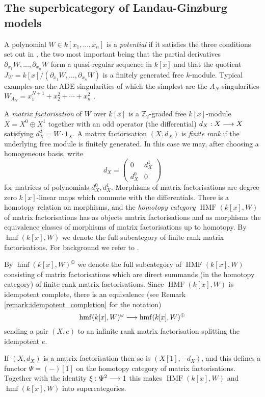 \documentclass[english,letter paper,12pt,leqno]{article}
\theoremstyle{example}
\numberwithin{equation}{section}
\DeclareMathOperator{\hmf}{hmf}
\DeclareMathOperator{\HMF}{HMF}
\begin{document}
\subsection{The superbicategory of Landau-Ginzburg models}\label{section:superbicatLG}

A polynomial $W \in k[x_1,\ldots,x_n]$ is a \emph{potential} if it satisfies the three conditions set out in \cite[Section 2.2]{lgdual}, the two most important being that the partial derivatives $\partial_{x_1} W, \ldots, \partial_{x_n} W$ form a quasi-regular sequence in $k[x]$ and that the quotient $J_W = k[x]/(\partial_{x_1} W, \ldots, \partial_{x_n} W)$ is a finitely generated free $k$-module. Typical examples are the ADE singularities \cite[I \S 2.4]{greuel} of which the simplest are the $A_N$-singularities $W_{A_N} = x_1^{N+1} + x_2^2 + \cdots + x_n^2$ .

A \emph{matrix factorisation} of $W$ over $k[x]$ is a $\mathbb{Z}_2$-graded free $k[x]$-module $X = X^0 \oplus X^1$ together with an odd operator (the differential) $d_X: X \longrightarrow X$ satisfying $d_X^2 = W \cdot 1_X$. A matrix factorisation $(X,d_X)$ is \emph{finite rank} if the underlying free module is finitely generated. In this case we may, after choosing a homogeneous basis, write
\[
d_X = \begin{pmatrix} 0 & d_X^1 \\ d_X^0 & 0 \end{pmatrix}
\]
for matrices of polynomials $d_X^0, d_X^1$. Morphisms of matrix factorisations are degree zero $k[x]$-linear maps which commute with the differentials. There is a homotopy relation on morphisms, and the \emph{homotopy category} $\HMF(k[x],W)$ of matrix factorisations has as objects matrix factorisations and as morphisms the equivalence classes of morphisms of matrix factorisations up to homotopy. By $\hmf(k[x],W)$ we denote the full subcategory of finite rank matrix factorisations. For background we refer to \cite{yoshino98}.

By $\hmf(k[x],W)^{\oplus}$ we denote the full subcategory of $\HMF(k[x],W)$ consisting of matrix factorisations which are direct summands (in the homotopy category) of finite rank matrix factorisations. Since $\HMF(k[x],W)$ is idempotent complete, there is an equivalence (see Remark \ref{remark:idempotent_completion} for the notation)
\[
\hmf(k[x],W)^\omega \lto \hmf(k[x],W)^{\oplus}
\]
sending a pair $(X,e)$ to an infinite rank matrix factorisation splitting the idempotent $e$.

If $(X,d_X)$ is a matrix factorisation then so is $(X[1], -d_X)$, and this defines a functor $\Psi = (-)[1]$ on the homotopy category of matrix factorisations. Together with the identity $\xi: \Psi^2 \longrightarrow 1$ this makes $\HMF(k[x],W)$ and $\hmf(k[x],W)$ into supercategories.
\end{document}
